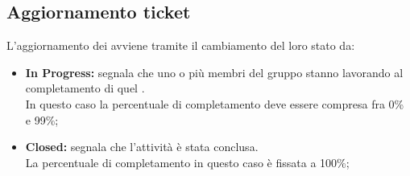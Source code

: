   \subsection{Aggiornamento ticket}
    L'aggiornamento dei  avviene tramite il cambiamento del loro stato da:
    \begin{itemize}
      \item \textbf{In Progress: }segnala che uno o più membri del gruppo stanno lavorando al completamento di quel .\\
      In questo caso la percentuale di completamento deve essere compresa fra 0\% e 99\%;
      \item \textbf{Closed: }segnala che l'attività è stata conclusa.\\
      La percentuale di completamento in questo caso è fissata a 100\%;
    \end{itemize}
